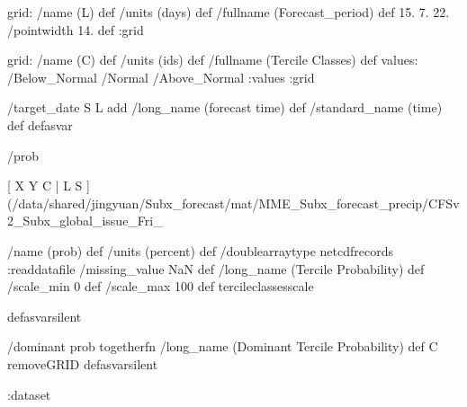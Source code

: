 \begin{ingrid}
grid:
/name (L) def
/units (days) def
/fullname (Forecast_period) def
15. 7. 22.
/pointwidth 14. def
:grid

grid:
/name (C) def
/units (ids) def
/fullname (Tercile Classes) def
values: /Below_Normal /Normal /Above_Normal :values
:grid

/target_date { S L add /long_name (forecast time) def /standard_name (time) def } defasvar

/prob {
[ X Y C | L S ] (/data/shared/jingyuan/Subx_forecast/mat/MME_Subx_forecast_precip/CFSv2_Subx_global_issue_Fri_%

/name (prob) def
/units (percent) def
/doublearraytype netcdfrecords :readdatafile
/missing_value NaN def
/long_name (Tercile Probability) def
/scale_min 0 def
/scale_max 100 def
tercileclassesscale
} defasvarsilent

/dominant {
prob togetherfn
/long_name (Dominant Tercile Probability) def
C removeGRID
} defasvarsilent

:dataset
\end{ingrid}
